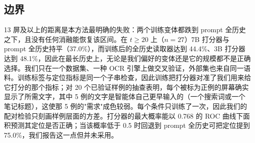 \subsection{边界}
\label{sec:limits}
13 屏及以上的距离是本方法最明确的失败：两个训练变体都跌到 prompt 全历史之下，且没有任何消融能恢复该区间。在 $t\ge20$ 上（$n=27$）7B 打分器与 prompt 全历史持平（37.0\%），而训练后的全历史读取器达到 44.4\%、3B 打分器达到 48.1\%，因此在最长历史上，无论是我们偏好的变体还是它的规模都不是正确选择。我们只在一个数据集、一种 OCR 引擎上做交叉验证，外部集也来自同一语料。训练标签与定位指标是同一个子串检查，因此训练把打分器对准了我们用来给它打分的那个指标；对 20 个已验证样例的抽查表明，每个被标为正例的屏幕确实显示了所需文字，其中 5 例的文字是智能体自己更早输入的（一个搜索词或一个笔记标题），这使那 5 例的"需求"成色较弱。每个条件只训练了一次，因此我们的配对检验只刻画样例层面的方差。打分器的最大概率能以 0.768 的 ROC 曲线下面积预测其定位是否正确；当该概率低于 0.5 时回退到 prompt 全历史可把定位提到 75.0\%，我们报告这一点但并未采用。
